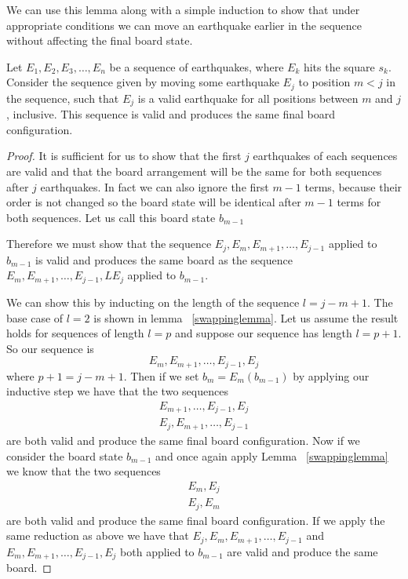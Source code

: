 \documentclass[runningheads,a4paper]{llncs}
\begin{document}
We can use this lemma along with a simple induction to show that under appropriate conditions we can move an earthquake earlier in the sequence without affecting the final board state.
\begin{lemma}
Let $E_1,E_2,E_3,\dots, E_n$ be a sequence of earthquakes, where $E_k$ hits the square $s_k$. Consider  the sequence given by moving some earthquake $E_j$ to position $m<j$ in the sequence, such that $E_j$ is a valid earthquake for all positions between $m$ and $j$, inclusive. 
This sequence is valid and produces the same final board configuration.
\end{lemma}
\label{shiftlemma}
\begin{proof}
It is sufficient for us to show that the first $j$ earthquakes of each sequences are valid and that the board arrangement will be the same for both sequences after $j$ earthquakes. In fact we can also ignore the first $m-1$ terms, because their order is not changed so the board state will be identical after $m-1$ terms for both sequences. Let us call this board state $b_{m-1}$

Therefore we must show that the sequence $E_j, E_m, E_{m+1}, \ldots, E_{j-1}$ applied to $b_{m-1}$ is valid and produces the same board as the sequence $E_m, E_{m+1}, \ldots, E_{j-1}, LE_j$ applied to $b_{m-1}$. 

We can show this by inducting on the length of the sequence $l=j-m+1$. The base case of $l=2$ is shown in lemma ~\ref{swappinglemma}. Let us assume the result holds for sequences of length $l=p$ and suppose our sequence has length $l=p+1$. So our sequence is 
\begin{equation*}
E_m, E_{m+1}, \ldots, E_{j-1}, E_j
\end{equation*}
where $p+1=j-m+1$. Then if we set $b_{m} = E_{m} (b_{m-1})$ by applying our inductive step we have that the two sequences 
\begin{align*}
E_{m+1}, \ldots, E_{j-1}, E_{j} \\ 
E_{j}, E_{m+1}, \ldots,  E_{j-1} 
\end{align*}
are both valid and produce the same final board configuration. Now if we consider the board state $b_{m-1}$ and once again apply Lemma ~\ref{swappinglemma} we know that the two sequences 
\begin{align*}
E_{m}, E_{j} \\
E_{j}, E_{m}
\end{align*}
are both valid and produce the same final board configuration. If we apply the same reduction as above  we have  that $E_j, E_m, E_{m+1}, \ldots, E_{j-1}$  and $E_m, E_{m+1}, \ldots, E_{j-1}, E_j$ both applied to $b_{m-1}$ are valid and produce the same board. 
\end{proof}
\end{document}
